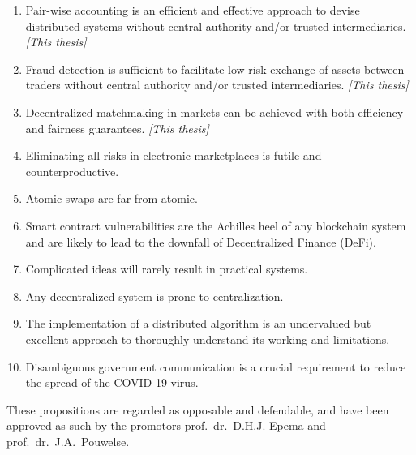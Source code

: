 \documentclass{propositions}
\begin{document}
\begin{enumerate}

\item Pair-wise accounting is an efficient and effective approach to devise distributed systems without central authority and/or trusted intermediaries. \emph{[This thesis]}

\item Fraud detection is sufficient to facilitate low-risk exchange of assets between traders without central authority and/or trusted intermediaries. \emph{[This thesis]}

\item Decentralized matchmaking in markets can be achieved with both efficiency and fairness guarantees. \emph{[This thesis]}

\item Eliminating all risks in electronic marketplaces is futile and counterproductive.

\item Atomic swaps are far from atomic.

\item Smart contract vulnerabilities are the Achilles heel of any blockchain system and are likely to lead to the downfall of Decentralized Finance (DeFi).

\item Complicated ideas will rarely result in practical systems.

\item Any decentralized system is prone to centralization.

\item The implementation of a distributed algorithm is an undervalued but excellent approach to thoroughly understand its working and limitations.


\item Disambiguous government communication is a crucial requirement to reduce the spread of the COVID-19 virus.




\end{enumerate}

\bigskip
\bigskip

\begin{center}
These propositions are regarded as opposable and defendable, and have been approved as such by the
promotors prof.\ dr.\ D.H.J. Epema and prof.\ dr.\ J.A.\ Pouwelse.
\end{center}
\end{document}
